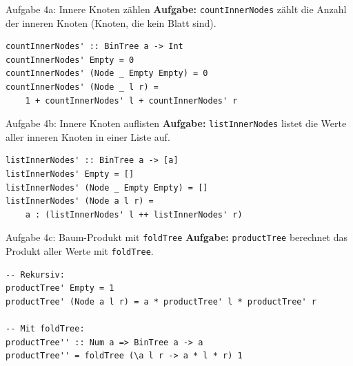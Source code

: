 \documentclass[aspectratio=169,11pt]{beamer}
\begin{document}
\begin{frame}[fragile]{Aufgabe 4a: Innere Knoten zählen}
    \textbf{Aufgabe:} \texttt{countInnerNodes} zählt die Anzahl der inneren Knoten (Knoten, die kein Blatt sind).
    
    \begin{tcolorbox}[modernbox, title=Rekursive Lösung]
\begin{lstlisting}
countInnerNodes' :: BinTree a -> Int
countInnerNodes' Empty = 0 
countInnerNodes' (Node _ Empty Empty) = 0 
countInnerNodes' (Node _ l r) = 
    1 + countInnerNodes' l + countInnerNodes' r
\end{lstlisting}
    \end{tcolorbox}
\end{frame}

\begin{frame}[fragile]{Aufgabe 4b: Innere Knoten auflisten}
    \textbf{Aufgabe:} \texttt{listInnerNodes} listet die Werte aller inneren Knoten in einer Liste auf.
    
    \begin{tcolorbox}[modernbox, title=Rekursive Lösung]
\begin{lstlisting}
listInnerNodes' :: BinTree a -> [a]
listInnerNodes' Empty = []
listInnerNodes' (Node _ Empty Empty) = []
listInnerNodes' (Node a l r) = 
    a : (listInnerNodes' l ++ listInnerNodes' r)
\end{lstlisting}
    \end{tcolorbox}
\end{frame}

\begin{frame}[fragile]{Aufgabe 4c: Baum-Produkt mit \texttt{foldTree}}
    \textbf{Aufgabe:} \texttt{productTree} berechnet das Produkt aller Werte mit \texttt{foldTree}.
    
    \begin{tcolorbox}[modernbox, title=Vergleich: Rekursion vs. Fold]
\begin{lstlisting}
-- Rekursiv:
productTree' Empty = 1
productTree' (Node a l r) = a * productTree' l * productTree' r

-- Mit foldTree:
productTree'' :: Num a => BinTree a -> a
productTree'' = foldTree (\a l r -> a * l * r) 1
\end{lstlisting}
    \end{tcolorbox}
\end{frame}

\end{document}

